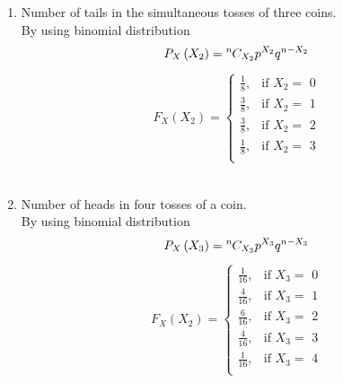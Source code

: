 \documentclass{article}
\providecommand{\brak}[1]{\ensuremath{\left(#1\right)}}
\newcommand*{\permcomb}[4][0mu]{{{}^{#3}\mkern#1#2_{#4}}}
\newcommand*{\comb}[1][-1mu]{\permcomb[#1]{C}}
\begin{document}
\begin{enumerate}[label=13.\arabic{enumi}.\arabic{enumii}]
\begin{enumerate}
\item Number of tails in the simultaneous tosses of three coins.\\
 By using binomial distribution\\
 \begin{align}
 P_X\brak{X_2} = \comb{n}{X_2}p^{X_2}q^{n-X_2}
 \end{align}
 \begin{align}
  F_X(X_2) =
    \begin{cases}
      \frac{1}{8}, & \text{if  $X_2 =$ 0}\\
      \frac{3}{8}, & \text{if  $X_2 =$ 1}\\
      \frac{3}{8}, & \text{if  $X_2 =$ 2}\\
      \frac{1}{8}, & \text{if  $X_2 =$ 3}\\
    \end{cases}       
\end{align}\\
\item Number of heads in four tosses of a coin.\\
 By using binomial distribution\\
 \begin{align}
 P_X\brak{X_3} = \comb{n}{X_3}p^{X_3}q^{n-X_3}
 \end{align}
 \begin{align}
  F_X(X_2) =
    \begin{cases}
      \frac{1}{16}, & \text{if  $X_3 =$ 0}\\
      \frac{4}{16}, & \text{if  $X_3 =$ 1}\\
      \frac{6}{16}, & \text{if  $X_3 =$ 2}\\
      \frac{4}{16}, & \text{if  $X_3 =$ 3}\\
      \frac{1}{16}, & \text{if  $X_3 =$ 4}\\
    \end{cases}       
\end{align}
\end{enumerate}
\end{enumerate}
\end{document}
